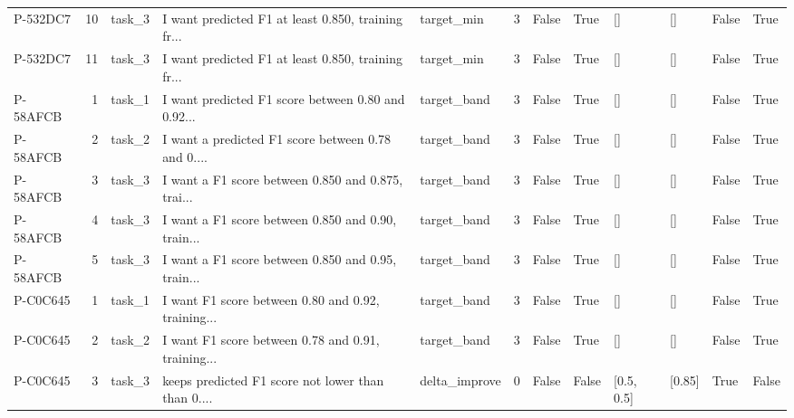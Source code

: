 \begin{tabular}{lrlllrllllll}
   P-532DC7 &       10 & task\_3 & I want predicted F1 at least 0.850, training fr... &    target\_min &          3 &          False &                  True &               [] &             [] &              False &             True \\
   P-532DC7 &       11 & task\_3 & I want predicted F1 at least 0.850, training fr... &    target\_min &          3 &          False &                  True &               [] &             [] &              False &             True \\
   P-58AFCB &        1 & task\_1 & I want predicted F1 score between 0.80 and 0.92... &   target\_band &          3 &          False &                  True &               [] &             [] &              False &             True \\
   P-58AFCB &        2 & task\_2 & I want a predicted F1 score between 0.78 and 0.... &   target\_band &          3 &          False &                  True &               [] &             [] &              False &             True \\
   P-58AFCB &        3 & task\_3 & I want a F1 score between 0.850 and 0.875, trai... &   target\_band &          3 &          False &                  True &               [] &             [] &              False &             True \\
   P-58AFCB &        4 & task\_3 & I want a F1 score between 0.850 and 0.90, train... &   target\_band &          3 &          False &                  True &               [] &             [] &              False &             True \\
   P-58AFCB &        5 & task\_3 & I want a F1 score between 0.850 and 0.95, train... &   target\_band &          3 &          False &                  True &               [] &             [] &              False &             True \\
   P-C0C645 &        1 & task\_1 & I want F1 score between 0.80 and 0.92, training... &   target\_band &          3 &          False &                  True &               [] &             [] &              False &             True \\
   P-C0C645 &        2 & task\_2 & I want F1 score between 0.78 and 0.91, training... &   target\_band &          3 &          False &                  True &               [] &             [] &              False &             True \\
   P-C0C645 &        3 & task\_3 & keeps predicted F1 score not lower than than 0.... & delta\_improve &          0 &          False &                 False &       [0.5, 0.5] &         [0.85] &               True &            False \\

\end{tabular}
